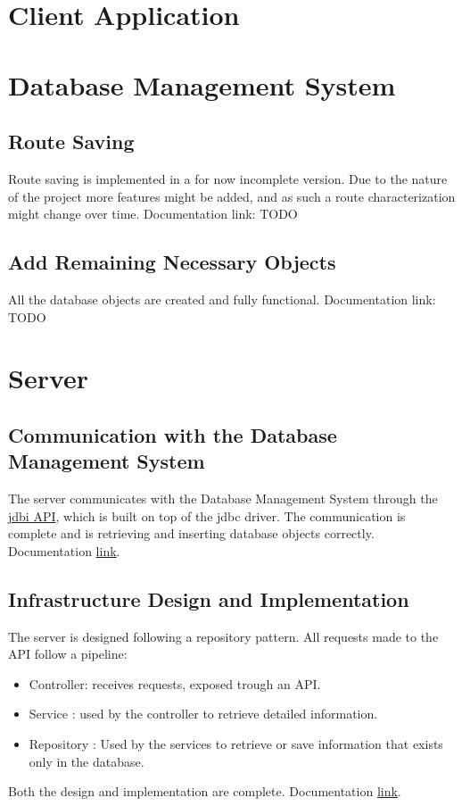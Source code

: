 \documentclass{article}
\begin{document}
    \newpage
    \section{Client Application}
   
    \newpage
    \section{Database Management System}
        \subsection*{Route Saving}
        Route saving is implemented in a for now incomplete version. Due to the nature of the project more features might be added, and as such a route characterization might change over time.
        Documentation link: TODO

        \subsection*{Add Remaining Necessary Objects}
        All the database objects are created and fully functional. 
        Documentation link: TODO
    \newpage
    \section{Server}    
        \subsection*{Communication with the Database Management System}
        The server communicates with the Database Management System through the \href{http://jdbi.org/}{jdbi API}, which is built on top of the jdbc driver.
        The communication is complete and is retrieving and inserting database objects correctly.
        Documentation \href{https://github.com/baltasarb/social-routing/wiki/3.-Communication-with-the-DBMS#jdbi}{link}.

        \subsection*{Infrastructure Design and Implementation}
        The server is designed following a repository pattern. All requests made to the API follow a pipeline:
        \begin{itemize}
            \item Controller: receives requests, exposed trough an API.
            \item Service : used by the controller to retrieve detailed information.
            \item Repository : Used by the services to retrieve or save information that exists only in the database.
        \end{itemize}
        Both the design and implementation are complete.
        Documentation \href{https://github.com/baltasarb/social-routing/wiki/4.-Server-design-and-implementation}{link}.
\end{document}
